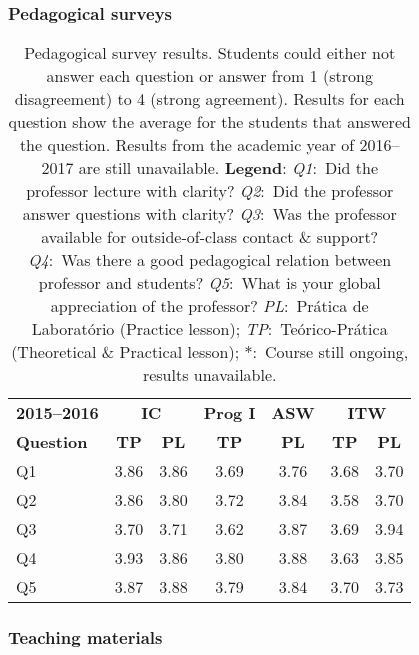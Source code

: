 \subsubsection{Pedagogical surveys}
\vspace{-1.5\baselineskip}
\begin{table}[H]
\centering
\caption{Pedagogical survey results. Students could either not answer each question or answer from 1 (strong disagreement) to 4 (strong agreement). Results for each question show the average for the students that answered the question. Results from the academic year of 2016--2017 are still unavailable.\hfill\break
\textbf{Legend}:
\textit{Q1}:~Did the professor lecture with clarity?
\textit{Q2}:~Did the professor answer questions with clarity?
\textit{Q3}:~Was the professor available for outside-of-class contact \& support?
\textit{Q4}:~Was there a good pedagogical relation between professor and students?
\textit{Q5}:~What is your global appreciation of the professor?
\textit{PL}:~Prática de Laboratório (Practice lesson);
\textit{TP}:~Teórico-Prática (Theoretical \& Practical lesson);
\textit{$*$}:~Course still ongoing, results unavailable.}
\label{tab:surveys}
\begin{tabular}{lcccccc}
\toprule
\bfseries 2015--2016
 & \multicolumn{2}{c}{\bfseries IC}
 & \bfseries Prog I
 & \bfseries ASW
 & \multicolumn{2}{c}{\bfseries ITW} \\
\bfseries Question
 & \bfseries TP
 & \bfseries PL
 & \bfseries TP
 & \bfseries PL
 & \bfseries TP
 & \bfseries PL \\
\midrule
Q1 & 3.86 & 3.86 & 3.69 & 3.76 & 3.68 & 3.70 \\
Q2 & 3.86 & 3.80 & 3.72 & 3.84 & 3.58 & 3.70 \\
Q3 & 3.70 & 3.71 & 3.62 & 3.87 & 3.69 & 3.94 \\
Q4 & 3.93 & 3.86 & 3.80 & 3.88 & 3.63 & 3.85 \\
Q5 & 3.87 & 3.88 & 3.79 & 3.84 & 3.70 & 3.73 \\
\bottomrule
\end{tabular}
\end{table}


\subsubsection{Teaching materials}

